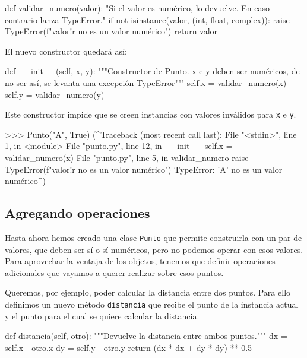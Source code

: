 \begin{codigo-python-sn}
def validar_numero(valor):
    "Si el valor es numérico, lo devuelve. En caso contrario lanza TypeError."
    if not isinstance(valor, (int, float, complex)):
        raise TypeError(f"{valor!r} no es un valor numérico")
    return valor
\end{codigo-python-sn}

El nuevo constructor quedará así:

\begin{codigo-python-sn}
    def __init__(self, x, y):
        """Constructor de Punto. x e y deben ser numéricos,
           de no ser así, se levanta una excepción TypeError"""
        self.x = validar_numero(x)
        self.y = validar_numero(y)
\end{codigo-python-sn}

Este constructor impide que se creen instancias con valores inválidos para
\lstinline!x! e \lstinline!y!.

\begin{codigo-python-sn}
>>> Punto("A", True)
(^Traceback (most recent call last):
  File "<stdin>", line 1, in <module>
  File "punto.py", line 12, in __init__
    self.x = validar_numero(x)
  File "punto.py", line 5, in validar_numero
    raise TypeError(f"{valor!r} no es un valor numérico")
TypeError: 'A' no es un valor numérico^)
\end{codigo-python-sn}

\subsection{Agregando operaciones}

Hasta ahora hemos creado una clase \lstinline!Punto! que permite
construirla con un par de valores, que deben ser sí o sí numéricos, pero no
podemos operar con esos valores.  Para aprovechar la ventaja de los objetos,
tenemos que definir operaciones adicionales que vayamos a querer realizar
sobre esos puntos.

Queremos, por ejemplo, poder calcular la distancia entre dos puntos.  Para
ello definimos un nuevo método \lstinline!distancia! que recibe el punto de
la instancia actual y el punto para el cual se quiere calcular la
distancia.

\begin{codigo-python-sn}
    def distancia(self, otro):
        """Devuelve la distancia entre ambos puntos."""
        dx = self.x - otro.x
        dy = self.y - otro.y
        return (dx * dx + dy * dy) ** 0.5
\end{codigo-python-sn}

